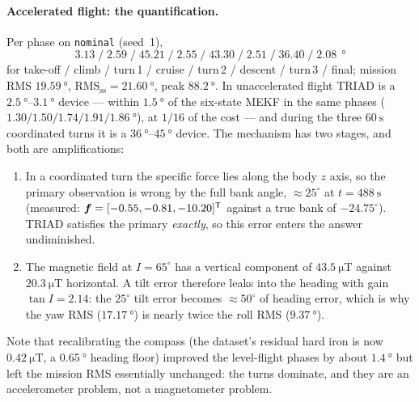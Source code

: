 \paragraph{Accelerated flight: the quantification.} Per phase on \texttt{nominal} (seed~1),
\[
3.13\;/\;2.59\;/\;\mathbf{45.21}\;/\;2.55\;/\;\mathbf{43.30}\;/\;2.51\;/\;\mathbf{36.40}\;/\;2.08
\ \SI{}{\degree}
\]
for take-off / climb / turn\,1 / cruise / turn\,2 / descent / turn\,3 / final; mission RMS
$\SI{19.59}{\degree}$, $\text{RMS}_{\text{ss}}=\SI{21.60}{\degree}$, peak $\SI{88.2}{\degree}$. In
unaccelerated flight TRIAD is a $\SI{2.5}{\degree}$--$\SI{3.1}{\degree}$ device --- within
$\SI{1.5}{\degree}$ of the six-state MEKF in the same phases
($1.30/1.50/1.74/1.91/\SI{1.86}{\degree}$), at $1/16$ of the cost --- and during the three
$\SI{60}{\second}$ coordinated turns it is a $\SI{36}{\degree}$--$\SI{45}{\degree}$ device. The
mechanism has two stages, and both are amplifications:
\begin{enumerate}[nosep]
\item In a coordinated turn the specific force lies along the body $z$ axis, so the primary
observation is wrong by the full bank angle, $\approx25^\circ$ at $t=\SI{488}{\second}$ (measured:
$\bm{f}=[-0.55,-0.81,-10.20]^{\mathsf{T}}$ against a true bank of $-24.75^\circ$). TRIAD satisfies the primary
\emph{exactly}, so this error enters the answer undiminished.
\item The magnetic field at $I=65^\circ$ has a vertical component of $\SI{43.5}{\micro\tesla}$
against $\SI{20.3}{\micro\tesla}$ horizontal. A tilt error therefore leaks into the heading with
gain $\tan I=2.14$: the $25^\circ$ tilt error becomes $\approx50^\circ$ of heading error, which is
why the yaw RMS ($\SI{17.17}{\degree}$) is nearly twice the roll RMS ($\SI{9.37}{\degree}$).
\end{enumerate}
Note that recalibrating the compass (the dataset's residual hard iron is now
$\SI{0.42}{\micro\tesla}$, a $\SI{0.65}{\degree}$ heading floor) improved the level-flight phases by
about $\SI{1.4}{\degree}$ but left the mission RMS essentially unchanged: the turns dominate, and
they are an accelerometer problem, not a magnetometer problem.

